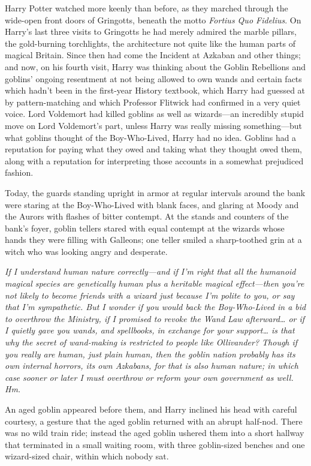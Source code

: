 Harry Potter watched more keenly than before, as they marched through the 
wide-open front doors of Gringotts, beneath the motto \emph{Fortius Quo 
Fidelius}. On Harry's last three visits to Gringotts he had merely admired the 
marble pillars, the gold-burning torchlights, the architecture not quite like 
the human parts of magical Britain. Since then had come the Incident at Azkaban 
and other things; and now, on his fourth visit, Harry was thinking about the 
Goblin Rebellions and goblins' ongoing resentment at not being allowed to own 
wands and certain facts which hadn't been in the first-year History textbook, 
which Harry had guessed at by pattern-matching and which Professor Flitwick had 
confirmed in a very quiet voice. Lord Voldemort had killed goblins as well as 
wizards---an incredibly stupid move on Lord Voldemort's part, unless Harry was 
really missing something---but what goblins thought of the Boy-Who-Lived, Harry 
had no idea. Goblins had a reputation for paying what they owed and taking what 
they thought owed them, along with a reputation for interpreting those accounts 
in a somewhat prejudiced fashion.

Today, the guards standing upright in armor at regular intervals around the 
bank were staring at the Boy-Who-Lived with blank faces, and glaring at Moody 
and the Aurors with flashes of bitter contempt. At the stands and counters of 
the bank's foyer, goblin tellers stared with equal contempt at the wizards 
whose hands they were filling with Galleons; one teller smiled a sharp-toothed 
grin at a witch who was looking angry and desperate.

\emph{If I understand human nature correctly---and if I'm right that all the 
humanoid magical species are genetically human plus a heritable magical 
effect---then you're not likely to become friends with a wizard just because 
I'm polite to you, or say that I'm sympathetic. But I wonder if you would back 
the Boy-Who-Lived in a bid to overthrow the Ministry, if I promised to revoke 
the Wand Law afterward{\ldots} or if I quietly gave you wands, and spellbooks, 
in exchange for your support{\ldots} is that why the secret of wand-making is 
restricted to people like Ollivander? Though if you really are human, just 
plain human, then the goblin nation probably has its own internal horrors, its 
own Azkabans, for that is also human nature; in which case sooner or later I 
must overthrow or reform your own government as well. Hm.}

An aged goblin appeared before them, and Harry inclined his head with careful 
courtesy, a gesture that the aged goblin returned with an abrupt half-nod. 
There was no wild train ride; instead the aged goblin ushered them into a short 
hallway that terminated in a small waiting room, with three goblin-sized 
benches and one wizard-sized chair, within which nobody sat.

